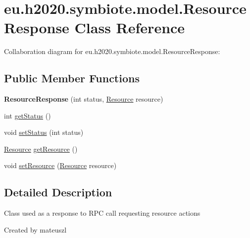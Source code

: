 \hypertarget{classeu_1_1h2020_1_1symbiote_1_1model_1_1ResourceResponse}{}\section{eu.\+h2020.\+symbiote.\+model.\+Resource\+Response Class Reference}
\label{classeu_1_1h2020_1_1symbiote_1_1model_1_1ResourceResponse}


Collaboration diagram for eu.\+h2020.\+symbiote.\+model.\+Resource\+Response\+:
\subsection*{Public Member Functions}
\begin{DoxyCompactItemize}
\item 
{\bfseries Resource\+Response} (int status, \hyperlink{classeu_1_1h2020_1_1symbiote_1_1model_1_1Resource}{Resource} resource)\hypertarget{classeu_1_1h2020_1_1symbiote_1_1model_1_1ResourceResponse_ad0141ca2e9efa0c7e25e40fcf62a476e}{}\label{classeu_1_1h2020_1_1symbiote_1_1model_1_1ResourceResponse_ad0141ca2e9efa0c7e25e40fcf62a476e}

\item 
int \hyperlink{classeu_1_1h2020_1_1symbiote_1_1model_1_1ResourceResponse_a291fd5f67222ea0f011793defaab2683}{get\+Status} ()
\item 
void \hyperlink{classeu_1_1h2020_1_1symbiote_1_1model_1_1ResourceResponse_ae7de4f16857ef5c7ed1d272684d2aa8d}{set\+Status} (int status)
\item 
\hyperlink{classeu_1_1h2020_1_1symbiote_1_1model_1_1Resource}{Resource} \hyperlink{classeu_1_1h2020_1_1symbiote_1_1model_1_1ResourceResponse_ac366edd9f5b18a37ad1f1935e5cc60f5}{get\+Resource} ()
\item 
void \hyperlink{classeu_1_1h2020_1_1symbiote_1_1model_1_1ResourceResponse_a65d8ae38a592038757a450b0e3bfe52b}{set\+Resource} (\hyperlink{classeu_1_1h2020_1_1symbiote_1_1model_1_1Resource}{Resource} resource)
\end{DoxyCompactItemize}


\subsection{Detailed Description}
Class used as a response to R\+PC call requesting resource actions

Created by mateuszl 


